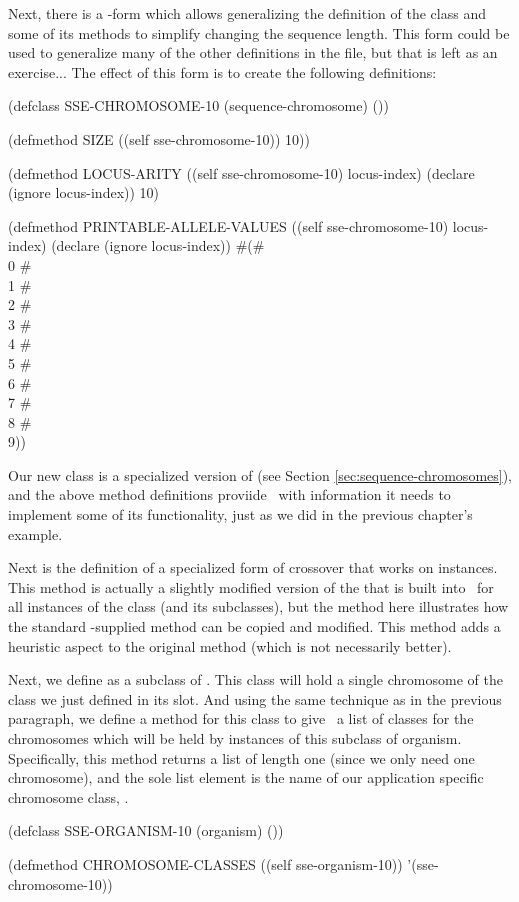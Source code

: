 {\samepage

Next, there is a -form which allows generalizing the definition of the
 class and some of its methods to simplify changing the sequence length.
This form could be used to generalize many of the other definitions in the file, but that
is left as an exercise... The effect of this  form is to create the following
definitions:
\begin{clcode}(defclass SSE-CHROMOSOME-10 (sequence-chromosome)
  ())

(defmethod SIZE ((self sse-chromosome-10))
  10))

(defmethod LOCUS-ARITY ((self sse-chromosome-10) locus-index)
  (declare (ignore locus-index))
  10)

(defmethod PRINTABLE-ALLELE-VALUES ((self sse-chromosome-10) locus-index)
  (declare (ignore locus-index))
  #(#\\0 #\\1 #\\2 #\\3 #\\4 #\\5 #\\6 #\\7 #\\8 #\\9))\end{clcode}
}%

\filbreak

Our new class is a specialized version of 
(see Section \ref{sec:sequence-chromosomes}), and the above method definitions proviide
\geco\ with information it needs to implement some of its functionality, just as
we did in the previous chapter's example.

Next is the definition of a specialized form of crossover that works on 
instances.
This method is actually a slightly modified version of the  that is
built into \geco\ for all instances of the  class (and its subclasses),
but the method here illustrates how the standard \geco-supplied method can be copied and
modified. This method adds a heuristic aspect to the original method (which is not necessarily better).


{\samepage
Next, we define  as a subclass of .
This class will hold a single chromosome of the class we just defined in its
 slot. And using the same technique as in the previous paragraph, we define
a method  for this class to give \geco\ a list of classes
for the chromosomes which will be held by instances of this subclass of organism.
Specifically, this method returns a list of length one (since we only need one
chromosome), and the sole list element is the name of our application specific
chromosome class, .
\begin{clcode}(defclass SSE-ORGANISM-10 (organism)
  ())

(defmethod CHROMOSOME-CLASSES ((self sse-organism-10))
  '(sse-chromosome-10))\end{clcode}
}%

